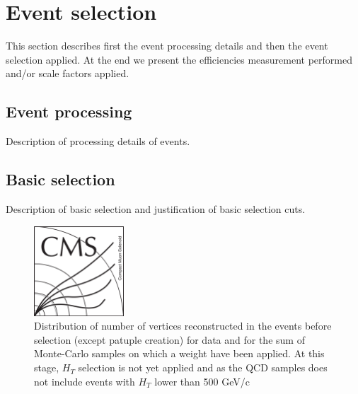 \section{Event selection}
\label{sec:sel}

This section describes first the event processing details and then the
event selection applied. At the end we present the efficiencies
measurement performed and/or scale factors applied.

\subsection{Event processing}

Description of processing details of events.

\subsection{Basic selection}

Description of basic selection and justification of basic selection cuts.

\begin{figure}[!Hhtbp]
  \begin{center}
    \includegraphics[width=0.3\textwidth]{figs/CMSlogo.png}
    \caption{Distribution of number of vertices reconstructed in the events before selection (except patuple creation) for data and for the sum of Monte-Carlo samples on which a weight have been applied.  At this stage, $H_T$ selection is not yet applied and as the QCD samples does not include events with $H_T$ lower than 500 GeV/c}
    \label{fig:Nvtcs}
  \end{center}
\end{figure}\clearpage

